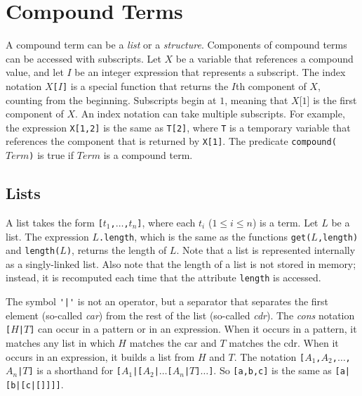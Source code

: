 \section{Compound Terms}
A compound term can be a \emph{list} or a \emph{structure}. Components of compound terms can be accessed with subscripts. Let $X$ be a variable that references a compound value, and let $I$ be an integer expression that represents a subscript. The index notation \texttt{$X$[$I$]} is a special function that returns the $I$th component of $X$, counting from the beginning. Subscripts begin at $1$, meaning that $X$[$1$] is the first component of $X$. An index notation can take multiple subscripts. For example, the expression \texttt{X[1,2]} is the same as \texttt{T[2]}, where \texttt{T} is a temporary variable that references the component that is returned by \texttt{X[1]}. The predicate \texttt{compound($Term$)} is true if $Term$ is a compound term.

\subsection{\label{subsec:lists}Lists}
A list takes the form \texttt{[$t_1$,$\ldots$,$t_{n}$]}, where each $t_i$ ($1\le i \le n$) is a term. Let $L$ be a list. The expression \texttt{$L$.length}, which is the same as the functions \texttt{get($L$,length)} and \texttt{length($L$)}, returns the length of $L$. Note that a list is represented internally as a singly-linked list.  Also note that the length of a list is not stored in memory; instead, it is recomputed each time that the attribute \texttt{length} is accessed.

The symbol \verb+'|'+ is not an operator, but a separator that separates the first element (so-called \emph{car}) from the rest of the list (so-called \emph{cdr}). The \emph{cons} notation {\tt [$H$\verb+|+$T$]} can occur in a pattern or in an expression. When it occurs in a pattern, it matches any list in which $H$ matches the car and $T$ matches the cdr. When it occurs in an expression, it builds a list from $H$ and $T$. The notation {\tt [$A_1$,$A_2$,$\ldots$,$A_n$\verb+|+$T$]} is a shorthand for {\tt [$A_1$\verb+|+[$A_2$\verb+|+$\ldots$[$A_n$\verb+|+$T$]$\ldots$]}. So \texttt{[a,b,c]} is the same as \texttt{[a|[b|[c|[]]]]}.


